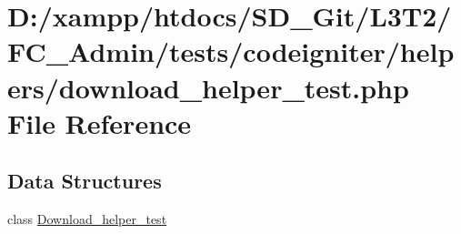 \hypertarget{_admin_2tests_2codeigniter_2helpers_2download__helper__test_8php}{}\section{D\+:/xampp/htdocs/\+S\+D\+\_\+\+Git/\+L3\+T2/\+F\+C\+\_\+\+Admin/tests/codeigniter/helpers/download\+\_\+helper\+\_\+test.php File Reference}
\label{_admin_2tests_2codeigniter_2helpers_2download__helper__test_8php}
\subsection*{Data Structures}
\begin{DoxyCompactItemize}
\item 
class \hyperlink{class_download__helper__test}{Download\+\_\+helper\+\_\+test}
\end{DoxyCompactItemize}
